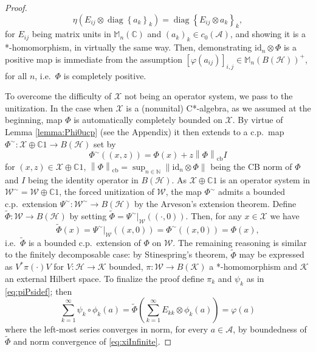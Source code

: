 \documentclass[reqno]{amsart}
\theoremstyle{plain}
\numberwithin{equation}{section}
\numberwithin{theorem}{section}
\numberwithin{lemma}{section}
\numberwithin{definition}{section}
\numberwithin{corollary}{section}
\numberwithin{remark}{section}
\newcommand{\naturals}{\mathbb{N}}
\newcommand{\complexes}{\mathbb{C}}
\newcommand{\id}[1]{\mathrm{id}_{#1}}
\newcommand{\hadj}{*}
\newcommand{\cbnorm}[1]{\left\| #1 \right\|_{\mathrm{cb}}}
\newcommand{\hilbert}{\mathcal{H}}
\newcommand{\matr}[1]{\mathbb{M}_{#1}(\complexes)}
\newcommand{\matra}[2]{\mathbb{M}_{#1}(#2)}
\begin{document}
\begin{proof}
    \begin{equation}
        \eta (E_{ij}\otimes \operatorname{diag}{\left\{a_k\right\}_k}) = \operatorname{diag}{\left\{E_{ij}\otimes a_k\right\}_k},
    \end{equation}
    for $E_{ij}$ being matrix units in $\matr{n}$ and $\left(a_k\right)_k \in c_0 (\mathscr{A})$, and showing it is a *-homomorphism, in virtually the same way. Then, demonstrating $\id{n}\otimes\Phi$ is a positive map is immediate from the assumption $\left[\varphi(a_{ij})\right]_{i,j} \in \matra{n}{B(\hilbert)}^+$, for all $n$, i.e.~$\Phi$ is completely positive.
    
    To overcome the difficulty of $\mathscr{X}$ not being an operator system, we pass to the unitization. In the case when $\mathscr{X}$ is a (nonunital) C*-algebra, as we assumed at the beginning, map $\Phi$ is automatically completely bounded on $\mathscr{X}$. By virtue of Lemma \ref{lemma:Phi0ucp} (see the Appendix) it then extends to a c.p.~map $\Phi^\sim : \mathscr{X}\oplus \complexes 1 \to B(\hilbert)$ set by
    \begin{equation}
        \Phi^\sim ((x,z)) = \Phi(x) + z \cbnorm{\Phi}I
    \end{equation}
    for $(x,z) \in \mathscr{X}\oplus \complexes 1$, $\cbnorm{\Phi}  = \sup_{n\in\naturals}\|\id{n}\otimes \Phi\|$ being the CB norm of $\Phi$ and $I$ being the identity operator in $B(\hilbert)$. As $\mathscr{X}\oplus \complexes 1$ is an operator system in $\mathscr{W}^\sim = \mathscr{W}\oplus \complexes 1$, the forced unitization of $\mathscr{W}$, the map $\Phi^\sim$ admits a bounded c.p.~extension $\Psi^\sim : \mathscr{W}^\sim \to B(\hilbert)$ by the Arveson's extension theorem. Define $\tilde{\Phi} : \mathscr{W} \to B(\hilbert)$ by setting $\tilde{\Phi} = \left.\Psi^\sim\right|_\mathscr{W}((\cdot,0))$. Then, for any $x\in\mathscr{X}$ we have
    \begin{equation}
        \tilde{\Phi}(x) = \left.\Psi^\sim\right|_\mathscr{W}((x,0)) = \Phi^\sim ((x,0)) = \Phi(x),
    \end{equation}
    i.e.~$\tilde{\Phi}$ is a bounded c.p.~extension of $\Phi$ on $\mathscr{W}$. The remaining reasoning is similar to the finitely decomposable case: by Stinespring's theorem, $\tilde{\Phi}$ may be expressed as $V^\hadj \pi(\cdot) V$ for $V : \hilbert\to \mathcal{K}$ bounded, $\pi : \mathscr{W}\to B(\mathcal{K})$ a *-homomorphism and $\mathcal{K}$ an external Hilbert space. To finalize the proof define $\pi_k$ and $\psi_k$ as in \eqref{eq:piPsidef}; then
    \begin{equation}
        \sum_{k=1}^{\infty} \psi_k \circ \phi_k(a) =  \tilde{\Phi}\left( \sum_{k=1}^{\infty}E_{kk}\otimes\phi_k(a)\right) = \varphi (a)
    \end{equation}
    where the left-most series converges in norm, for every $a\in\mathscr{A}$, by boundedness of $\tilde{\Phi}$ and norm convergence of \eqref{eq:xiInfinite}.
\end{proof}
\end{document}
